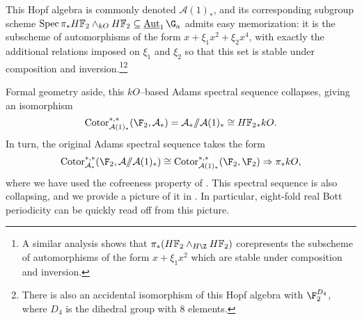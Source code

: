 \begin{example}
\begin{center}
\end{center}
This Hopf algebra is commonly denoted \(\mathcal A(1)_*\), and its corresponding subgroup scheme \(\Spec \pi_* \HFtwo \sm_{kO} \HFtwo \subseteq \InternalAut_1 \G_a\) admits easy memorization: it is the subscheme of automorphisms of the form \(x + \xi_1 x^2 + \xi_2 x^4\), with exactly the additional relations imposed on \(\xi_1\) and \(\xi_2\) so that this set is stable under composition and inversion.\footnote{A similar analysis shows that \(\pi_* (\HFtwo \wedge_{H\Z} \HFtwo)\) corepresents the subscheme of automorphisms of the form \(x + \xi_1 x^2\) which are stable under composition and inversion.}\footnote{There is also an accidental isomorphism of this Hopf algebra with \(\F_2^{D_4}\), where \(D_4\) is the dihedral group with \(8\) elements.}

Formal geometry aside, this \(kO\)--based Adams spectral sequence collapses, giving an isomorphism \[\Cotor^{*, *}_{\mathcal A(1)_*}(\F_2, \mathcal A_*) = \mathcal A_* \mmod \mathcal A(1)_* \cong \HFtwo_* kO.\]  In turn, the original Adams spectral sequence takes the form \[\Cotor^{*, *}_{\mathcal A_*}(\F_2, \mathcal A \mmod \mathcal A(1)_*) \cong \Cotor^{*, *}_{\mathcal A(1)_*}(\F_2, \F_2) \Rightarrow \pi_* kO,\] where we have used the cofreeness property of .  This spectral sequence is also collapsing, and we provide a picture of it in .  In particular, eight-fold real Bott periodicity can be quickly read off from this picture.
\end{example}

